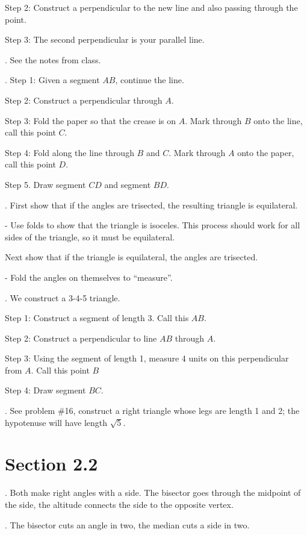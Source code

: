 Step 2: Construct a perpendicular to the new line and also passing through the point.

Step 3: The second perpendicular is your parallel line.


 .  See the notes from class.


.  Step 1: Given a segment $AB$, continue the line. 

Step 2: Construct a perpendicular through $A$.

Step 3: Fold the paper so that the crease is on $A$.  Mark through $B$ onto the line, call this point $C$. 

Step 4: Fold along the line through $B$ and $C$.  Mark through $A$ onto the paper, call this point $D$. 

Step 5.  Draw segment $CD$ and segment $BD$.


.  First show that if the angles are trisected, the resulting triangle is equilateral. 

 - Use folds to show that the triangle is isoceles.  This process should work for all sides of the triangle, so it must be equilateral.
 
 Next show that if the triangle is equilateral, the angles are trisected. 
 
  - Fold the angles on themselves to ``measure''.
  

.  We construct a 3-4-5 triangle.  

Step 1: Construct a segment of length 3.  Call this $AB$. 

Step 2: Construct a perpendicular to line $AB$ through $A$. 

Step 3: Using the segment of length 1, measure 4 units on this perpendicular from $A$.  Call this point $B$ 

Step 4: Draw segment $BC$.


.  See problem \#16, construct a right triangle whose legs are length 1 and 2; the hypotenuse will have length $\sqrt{5}$.


\section*{Section 2.2}


. Both make right angles with a side.  The bisector goes through the midpoint of the side, the altitude connects the side to the opposite vertex.

.  The bisector cuts an angle in two, the median cuts a side in two.


